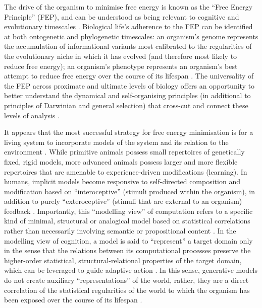 \begin{CJK}{UTF8}{gbsn}
    The drive of the organism to minimise free energy is known as the ``Free Energy Principle'' (FEP), and can be understood as being relevant to cognitive and evolutionary timescales \citep[see][]{Friston2010}.  Biological life's adherence to the FEP can be identified at both ontogenetic and phylogenetic timescales: an organism's genome represents the accumulation of informational variants most calibrated to the regularities of the evolutionary niche in which it has evolved (and therefore most likely to reduce free energy); an organism's phenotype represents an organism's best attempt to reduce free energy over the course of its lifespan \citep{Ramstead2017}.  The universality of the FEP across proximate and ultimate levels of biology offers an opportunity to better understand the dynamical and self-organising principles (in additional to principles of Darwinian and general selection) that cross-cut and connect these levels of analysis \citep{Caporael2001,Badcock2012,Laland2015,Ramstead2017}.

    It appears that the most successful strategy for free energy minimisation is for a living system to incorporate models of the system and its relation to the environment \citep{Conant1970}.  While primitive animals possess small repertoires of genetically fixed, rigid models, more advanced animals possess larger and more flexible repertoires that are amenable to experience-driven modifications (learning).  In humans, implicit models become responsive to self-directed composition and modification based on ``interoceptive'' (stimuli produced within the organism), in addition to purely ``exteroceptive'' (stimuli that are external to an organism) feedback \citep{Yufik1998,FeldmanBarrett2015}.  Importantly, this ``modelling view'' of computation \citep{Grush 2001;Chirimuuta2014} refers to a specific kind of minimal, structural or analogical model based on statistical correlations rather than necessarily involving semantic or propositional content \citep[also known as ``generative models''][]{Friston2001,OBrien2004,Huto2015}.  In the modelling view of cognition, a model is said to ``represent'' a target domain only in the sense that the relations between its computational processes preserve the higher-order statistical, structural-relational properties of the target domain, which can be leveraged to guide adaptive action \citep[see][8]{Ramstead2016}.  In this sense, generative models do not create auxiliary ``representations'' of the world, rather, they are a direct correlation of the statistical regularities of the world to which the organism has been exposed over the course of its lifespan \citep{Ramstead2017}.


\end{CJK}

